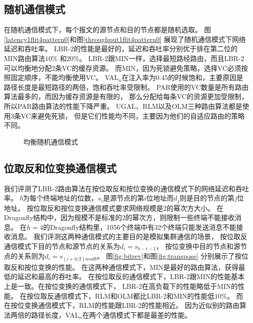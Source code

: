 \subsection{随机通信模式}

在随机通信模式下，每个报文的源节点和目的节点都是随机选取。
图\ref{latency1flit4pattern0}和图\ref{throughput1flit4pattern0}
展现了随机通信模式下网络延迟和吞吐率。
LBR-2的性能是最好的，延迟和吞吐率分别优于排在第二位的MIN路由算法$10\%$ 和$20\%$。
LBR-2跟MIN一样，选择最短路经路由，而且LBR-2可以均衡地分配2条VC的缓存资源。
而MIN，因为死锁避免策略，选择VC必须按照固定顺序，不能均衡使用VC。
VAL$_n$在注入率为0.45的时候饱和，主要原因是路径长度是最短路径的两倍，饱和吞吐率受限制。
PAR使用的VC数量是所有路由算法最多的，而因为缓存资源是有限的，
那么分配给每条VC的资源更加受限制，所以PAR路由算法的性能下降严重。
UGAL、RLM以及OLM三种路由算法都是使用3条VC来避免死锁，
但是它们性能均不同，主要因为他们的自适应路由的策略不同。

\begin{figure}[htbp]
  \centering
  \begin{minipage}[t]{\textwidth}
  \centering
  \caption{均衡随机通信模式}
  \label{fig:random}
  \end{minipage}
  \end{figure}

\subsection{位取反和位变换通信模式}

我们评测了LBR-2路由算法在按位取反和按位变换的通信模式下的网络延迟和吞吐率。
$b$为每个终端地址的位数，$s_i$是源节点的第$i$位地址而$d_j$则是目的节点的第$j$位地址。
按位取反和按位变换通信模式要求网络规模是2的幂次方大小。
在Dragonfly结构中，因为规模不是标准的2的幂次方，则限制一些终端不能接收消息。
在$h=4$的Dragonfly结构里，1056个终端中有32个终端只能发送消息不能接收消息。
我们评测这两种通信模式的主要目的是模拟集群通信的场景，
按位取反通信模式下目的节点和源节点的关系为$d_i=s_{b-i-1}$，
按位变换中目的节点和源节点的关系则为$d_i=s_{(i+b/2) mod b}$。
图\ref{fig:bitrev}和图\ref{fig:transpose} 分别展示了按位取反和按位变换的性能。
在这两种通信模式下，MIN是最好的路由算法，获得最低的延迟和最高的吞吐率。
在按位取反的通信模式下，LBR-2跟MIN的性能基本上是一致。在按位变换的通信模式下，
LBR-2在高负载下的性能略低于MIN的性能。
在按位取反通信模式下，RLM和OLM都比LBR-2和MIN的性能低$10\%$。
而在按位变换通信模式下，RLM的性能跟LBR-2的性能相近。
因为近似别的路由算法两倍的路径长度，VAL$_n$在两个通信模式下都是最差的性能。

